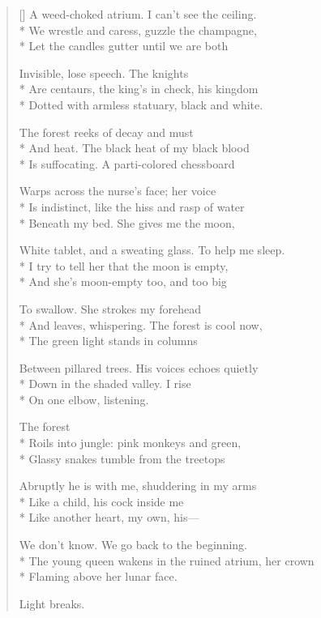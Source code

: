 \begin{verse}[\versewidth]
A weed-choked atrium.  I can't see the ceiling.\\*
We wrestle and caress, guzzle the champagne,\\*
Let the candles gutter until we are both

Invisible, lose speech. The knights\\*
Are centaurs, the king's in check, his kingdom\\*
Dotted with armless statuary, black and white.

The forest reeks of decay and must\\*
And heat. The black heat of my black blood\\*
Is suffocating.  A parti-colored chessboard   

Warps across the nurse's face; her voice\\*
Is indistinct, like the hiss and rasp of water\\*
Beneath my bed.  She gives me the moon,

White tablet, and a sweating glass. To help me sleep.\\*
I try to tell her that the moon is empty,\\*
And she's moon-empty too, and too big

To swallow. She strokes my forehead\\*
And leaves, whispering.  The forest is cool now,\\*
The green light stands in columns

Between pillared trees.  His voices echoes quietly\\*
Down in the shaded valley.  I rise \\*
On one elbow, listening.

                                          The forest\\*
Roils into jungle: pink monkeys and green,\\*
Glassy snakes tumble from the treetops

Abruptly he is with me, shuddering in my arms\\*
Like a child, his cock inside me\\*
Like another heart, my own, his---

We don't know.  We go back to the beginning.\\*
The young queen wakens in the ruined atrium, her crown\\*
Flaming above her lunar face.

Light breaks.
\end{verse}
